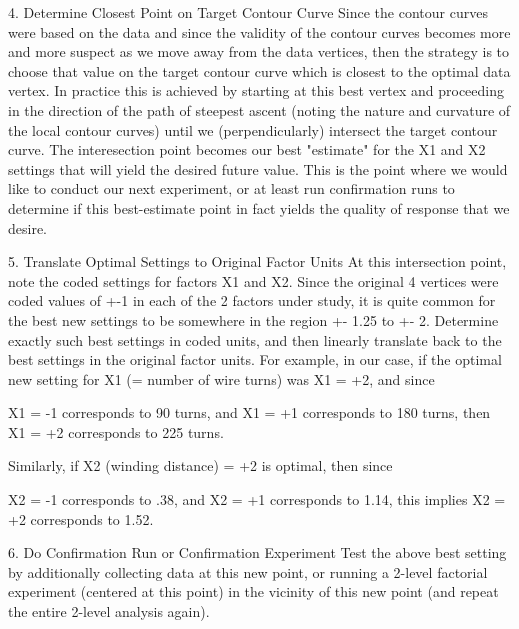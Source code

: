       4. Determine Closest Point on Target Contour Curve
         Since the contour curves were based on the
         data and since the validity of the
         contour curves becomes more and more
         suspect as we move away from the data
         vertices, then the strategy is to choose
         that value on the target contour curve which is
         closest to the optimal data vertex.  In
         practice this is achieved by starting at
         this best vertex and proceeding in the
         direction of the path of steepest ascent
         (noting the nature and curvature of the
         local contour curves) until we
         (perpendicularly) intersect the target
         contour curve.  The interesection point
         becomes our best "estimate" for the X1 and X2
         settings that will yield the desired
         future value.  This is the point where we
         would like to conduct our next
         experiment, or at least run confirmation
         runs to determine if this best-estimate
         point in fact yields the quality of
         response that we desire.

      5. Translate Optimal Settings to Original Factor Units
         At this intersection point, note the
         coded settings for factors X1 and X2.
         Since the original 4 vertices were coded
         values of +-1 in each of the 2 factors
         under study, it is quite common for the
         best new settings to be somewhere in the
         region +- 1.25 to +- 2. Determine exactly
         such best settings in coded units, and
         then linearly translate back to the best
         settings in the original factor units.
         For example, in our case, if the optimal
         new setting for X1 (= number of wire
         turns) was X1 = +2, and since

            X1 = -1 corresponds to  90 turns, and
            X1 = +1 corresponds to 180 turns, then
            X1 = +2 corresponds to 225 turns.

         Similarly, if X2 (winding distance) = +2
         is optimal, then since

            X2 = -1 corresponds to  .38, and
            X2 = +1 corresponds to 1.14, this implies
            X2 = +2 corresponds to 1.52.

      6. Do Confirmation Run or Confirmation Experiment
         Test the above best setting by
         additionally collecting data at this new
         point, or running a 2-level factorial
         experiment (centered at this point) in
         the vicinity of this new point (and
         repeat the entire 2-level analysis
         again).

